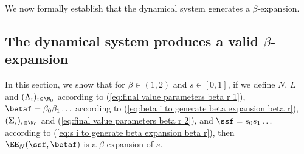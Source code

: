 We now formally establish that the dynamical system generates a $\beta$-expansion.

\subsection{\texorpdfstring{The dynamical system produces a valid $\beta$-expansion}{}}


In this section, we show that for $\beta \in (1,2)$ and $s \in [0,1]$, if we define $N$, $L$ and $(\Lambda_i)_{i \in \N_0}$ according to (\ref{eq:final value parameters beta r 1}), $\betaf = \beta_0\beta_1\ldots$ according to (\ref{eq:beta i to generate beta expansion beta r}), $(\Sigma_i)_{i \in \N_0}$  and (\ref{eq:final value parameters beta r 2}),  and $\ssf = s_0s_1\ldots $ according to (\ref{eq:s i to generate beta expansion beta r}), then $\EE_N(\ssf, \betaf)$ is a $\beta$-expansion of $s$.

